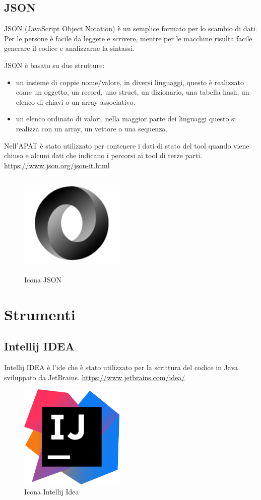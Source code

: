 \subsection*{JSON}
JSON (JavaScript Object Notation) è un semplice formato per lo scambio di dati.
Per le persone è facile da leggere e scrivere, mentre per le macchine risulta facile generare il codice e analizzarne la sintassi.

JSON è basato su due strutture:
\begin{itemize}
    \item un insieme di coppie nome/valore, in diversi linguaggi, questo è realizzato come un oggetto, un record, uno struct, un dizionario, una tabella hash, un elenco di chiavi o un array associativo.
    \item un elenco ordinato di valori, nella maggior parte dei linguaggi questo si realizza con un array, un vettore o una sequenza.
\end{itemize}
Nell'APAT è stato utilizzato per contenere i dati di stato del tool quando viene chiuso e alcuni dati che indicano i percorsi ai tool di terze parti.
\url{https://www.json.org/json-it.html}
\begin{figure}[H]
    \centering
    \includegraphics[width=5cm, height=5cm]{./immagini/json.png}
    \caption{Icona JSON}\label{fig:json}
\end{figure}



\section{Strumenti}\label{sec:strumenti}

\subsection*{Intellij IDEA}
Intellij IDEA è l'\gls{ide} che è stato utilizzato per la scrittura del codice in Java sviluppato da JetBrains.
\url{https://www.jetbrains.com/idea/}
\begin{figure}[H]
    \centering
    \includegraphics[width=5cm, height=5cm]{./immagini/intellij.png}
    \caption{Icona Intellij Idea}\label{fig:intellij}
\end{figure}

